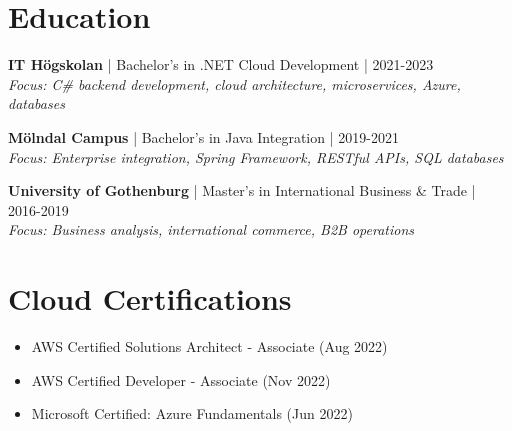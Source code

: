 \documentclass[11pt,a4paper]{article}
\begin{document}
\section*{Education}
\textbf{IT Högskolan} | Bachelor's in .NET Cloud Development | 2021-2023\\
\textit{Focus: C\# backend development, cloud architecture, microservices, Azure, databases}

\textbf{Mölndal Campus} | Bachelor's in Java Integration | 2019-2021\\
\textit{Focus: Enterprise integration, Spring Framework, RESTful APIs, SQL databases}

\textbf{University of Gothenburg} | Master's in International Business \& Trade | 2016-2019\\
\textit{Focus: Business analysis, international commerce, B2B operations}

\section*{Cloud Certifications}
\begin{itemize}[noitemsep]
\item AWS Certified Solutions Architect - Associate (Aug 2022)
\item AWS Certified Developer - Associate (Nov 2022)
\item Microsoft Certified: Azure Fundamentals (Jun 2022)
\end{itemize}
\end{document}
